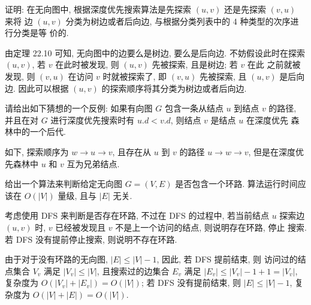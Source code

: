 \documentclass[boxes]{homework}
\begin{document}
\begin{problem}
证明: 在无向图中, 根据深度优先搜索算法是先探索 $(u, v)$ 还是先探索 $(v, u)$ 来将
边 $(u, v)$ 分类为树边或者后向边, 与根据分类列表中的 4 种类型的次序进行分类是等
价的.
\end{problem}
\begin{solution}
    由定理 22.10 可知, 无向图中的边要么是树边, 要么是后向边. 不妨假设此时在探索
    $(u, v)$, 若 $v$ 在此时被发现, 则 $(u, v)$ 先被探索, 且是树边; 若 $v$ 在此
    之前就被发现, 则 $(v, u)$ 在访问 $v$ 时就被探索了, 即 $(v, u)$ 先被探索, 且
    $(u, v)$ 是后向边. 因此可以根据 $(u, v)$ 的探索顺序将其分类为树边或者后向边.
\end{solution}

\begin{problem}
请给出如下猜想的一个反例: 如果有向图 $G$ 包含一条从结点 $u$ 到结点 $v$ 的路径,
并且在对 $G$ 进行深度优先搜索时有 $u.d < v.d$, 则结点 $v$ 是结点 $u$ 在深度优先
森林中的一个后代.
\end{problem}
\begin{solution}
    如下, 探索顺序为 $w \to u \to v$, 且存在从 $u$ 到 $v$ 的路径 $u\to w \to v$,
    但是在深度优先森林中 $u$ 和 $v$ 互为兄弟结点.
    \begin{center}
    \end{center}
\end{solution}

\begin{problem}
给出一个算法来判断给定无向图 $G = (V, E)$ 是否包含一个环路. 算法运行时间应该在
$O(|V|)$ 量级, 且与 $|E|$ 无关.
\end{problem}
\begin{solution}
    考虑使用 DFS 来判断是否存在环路, 不过在 DFS 的过程中, 若当前结点 $u$ 探索边
    $(u, v)$ 时, $v$ 已经被发现且 $v$ 不是上一个访问的结点, 则说明存在环路, 停止
    搜索. 若 DFS 没有提前停止搜索, 则说明不存在环路.

    由于对于没有环路的无向图, $|E| \leqslant |V| - 1$, 因此, 若 DFS 提前结束, 则
    访问过的结点集合 $V_{v}$ 满足 $|V_{v}| \leqslant |V|$, 且搜索过的边集合
    $E_{v}$ 满足 $|E_{v}| \leqslant |V_{v}| - 1 + 1 = |V_{v}|$, 复杂度为
    $O(|V_{v}| + |E_{v}|) = O(|V|)$; 若 DFS 没有提前结束, 则
    $|E| \leqslant |V| - 1$, 复杂度为 $O(|V| + |E|) = O(|V|)$.
\end{solution}
\end{document}

